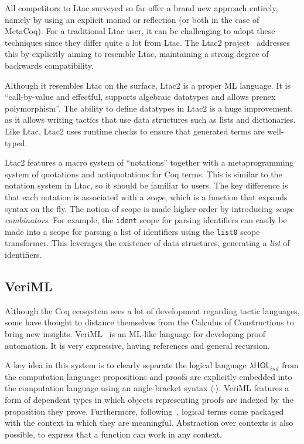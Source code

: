 All competitors to Ltac surveyed so far offer a brand new approach entirely,
namely by using an explicit monad or reflection (or both in the case of MetaCoq).
For a traditional Ltac user, it can be challenging to adopt these techniques
since they differ quite a lot from Ltac.
The Ltac2 project~\cite{ltac2} addresses this by explicitly aiming to resemble
Ltac, maintaining a strong degree of backwards compatibility.

Although it resembles Ltac on the surface, Ltac2 is a proper ML language.
It is ``call-by-value and effectful, supports algebraic datatypes and allows
prenex polymorphism''.
The ability to define datatypes in Ltac2 is a huge improvement, as it allows
writing tactics that use data structures such as lists and dictionaries.
Like Ltac, Ltac2 uses runtime checks to ensure that generated terms are
well-typed.

Ltac2 features a macro system of ``notations'' together with a metaprogramming
system of quotations and antiquotations for Coq terms.
This is similar to the notation system in Ltac, so it should be familiar to
users.
The key difference is that each notation is associated with a \emph{scope},
which is a function that expands syntax on the fly.
The notion of scope is made higher-order by introducing
\emph{scope combinators}.
For example, the \texttt{ident} scope for parsing identifiers can easily be made
into a scope for parsing a list of identifiers using the \texttt{list0} scope
transformer.
This leverages the existence of data structures, generating a \emph{list} of
identifiers.


\subsection{VeriML}

\newcommand{\lhol}{$\lambda \mathsf{HOL}_{ind}$}
Although the Coq ecosystem sees a lot of development regarding tactic languages,
some have thought to distance themselves from the Calculus of Constructions to
bring new insights.
VeriML~\cite{Stampoulis:ICFP10, Stampoulis:POPL12} is an ML-like language for
developing proof automation.  It is very expressive, having references and
general recursion.

A key idea in this system is to clearly separate the logical language
\lhol{} from the computation language: propositions and proofs are explicitly
embedded into the computation language using an angle-bracket syntax $\langle
\cdot \rangle$.
VeriML features a form of dependent types in which objects representing proofs
are indexed by the proposition they prove.
Furthermore, following~\cite{Nanevski:ICML05,Pientka:PPDP08}, logical terms come
packaged with the context in which they are meaningful.
Abstraction over contexts is also possible, to express that a function can work
in any context.

